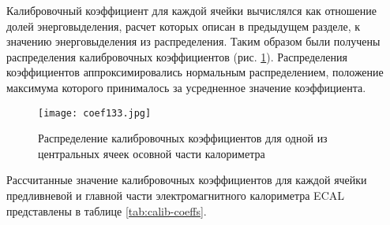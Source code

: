 Калибровочный коэффициент для каждой ячейки вычислялся как отношение долей энерговыделения, расчет которых описан в предыдущем разделе, к значению энерговыделения из распределения. Таким образом были получены распределения калибровочных коэффициентов (рис. \ref{fig:coeffDist}). Распределения коэффициентов аппроксимировались нормальным распределением, положение максимума которого принималось за усредненное значение коэффициента.

\begin{figure}[H]
    \centering
    \texttt{[image: coef133.jpg]}
    \caption{Распределение калибровочных коэффициентов для одной из центральных ячеек осовной части калориметра}
    \label{fig:coeffDist}
\end{figure}

Рассчитанные значение калибровочных коэффициентов для каждой ячейки предливневой и главной части электромагнитного калориметра ECAL представлены в таблице \ref{tab:calib-coeffs}.

